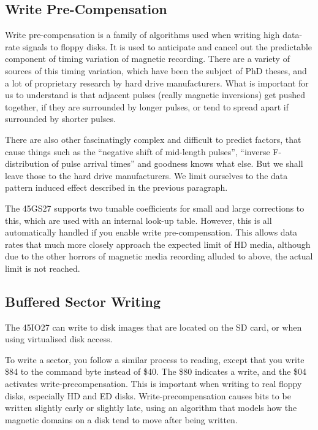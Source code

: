\subsection{Write Pre-Compensation}

Write pre-compensation is a family of algorithms used when writing high data-rate signals to floppy disks.
It is used to anticipate and cancel out the predictable component of timing variation of magnetic recording.
There are a variety of sources of this timing variation, which have been the subject of PhD theses, and a
lot of proprietary research by hard drive manufacturers.  What is important for us to understand is that adjacent
pulses (really magnetic inversions) get pushed together, if they are surrounded by longer pulses, or tend to
spread apart if surrounded by shorter pulses.

There are also other fascinatingly complex and difficult to predict factors, that cause things such as the ``negative
shift of mid-length pulses'', ``inverse F-distribution of pulse arrival times'' and goodness knows what else.  But
we shall leave those to the hard drive manufacturers.  We limit ourselves to the data pattern induced effect described
in the previous paragraph.

The 45GS27 supports two tunable coefficients for small and large corrections to this,
which are used with an internal look-up table.  However, this is all automatically handled if you enable write pre-compensation.
This allows data rates that much more closely approach the expected limit of HD media, although due to the other horrors of
magnetic media recording alluded to above, the actual limit is not reached.

\subsection{Buffered Sector Writing}

The 45IO27 can write to disk images that are located on the SD card,
or when using virtualised disk access.

To write a sector, you follow a similar process to reading, except
that you write \$84 to the command byte instead of \$40.  The \$80
indicates a write, and the \$04 activates write-precompensation.  This
is important when writing to real floppy disks, especially HD and ED
disks.  Write-precompensation causes bits to be written slightly early
or slightly late, using an algorithm that models how the magnetic
domains on a disk tend to move after being written.

